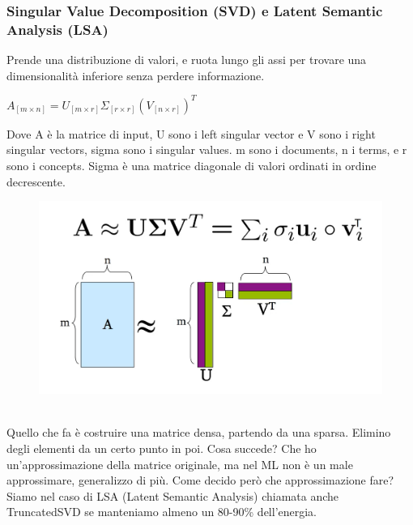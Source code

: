 \newpage

\subsubsection{Singular Value Decomposition (SVD) e Latent Semantic Analysis (LSA)}
Prende una distribuzione di valori, e ruota lungo gli assi per trovare una dimensionalità inferiore senza perdere informazione. 
\begin{center}
    \begin{math}
        A_{[m \times n]} = U_{[m \times r]} \Sigma_{[r \times r]} (V_{[n \times r]})^T
    \end{math}
\end{center}
Dove A è la matrice di input, U sono i left singular vector e V sono i right singular vectors, sigma sono i singular values. m sono i documents, n i terms, e r sono i concepts. Sigma è una matrice diagonale di valori ordinati in ordine decrescente. 
\\
\begin{figure}[th]
    \centering
    \includegraphics[scale=0.4]{Text Analysis/img/svd.png}
\end{figure}
\\
Quello che fa è costruire una matrice densa, partendo da una sparsa. Elimino degli elementi da un certo punto in poi. Cosa succede? Che ho un'approssimazione della matrice originale, ma nel ML non è un male approssimare, generalizzo di più. Come decido però che approssimazione fare? Siamo nel caso di LSA (Latent Semantic Analysis) chiamata anche TruncatedSVD se manteniamo almeno un 80-90\% dell'energia. 

